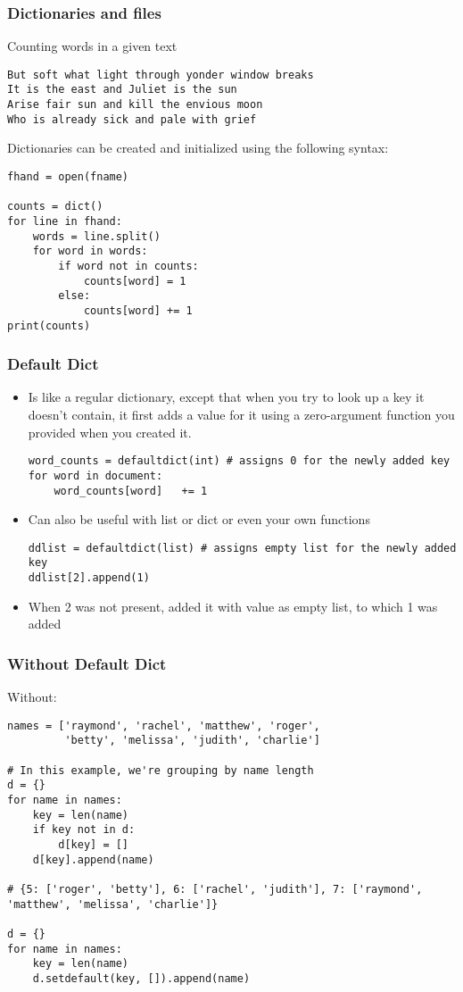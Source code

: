 \begin{frame}[fragile]\frametitle{Dictionaries and files}
Counting words in a given text
\begin{lstlisting}
But soft what light through yonder window breaks
It is the east and Juliet is the sun
Arise fair sun and kill the envious moon
Who is already sick and pale with grief
\end{lstlisting}

  
  Dictionaries can be created and initialized using the following syntax:
\begin{lstlisting}
fhand = open(fname)

counts = dict()
for line in fhand:
	words = line.split()
	for word in words:
		if word not in counts:
			counts[word] = 1
		else:
		    counts[word] += 1
print(counts)
\end{lstlisting}

\end{frame}

\begin{frame}[fragile]\frametitle{Default Dict}
  \begin{itemize}
  \item Is like a regular dictionary, except that when you try	to look up a key it doesn't	contain, it first adds a value for it using a zero-argument function you provided when you created it.	
  \begin{lstlisting}
word_counts = defaultdict(int) # assigns 0 for the newly added key
for word in document:
	word_counts[word]	+= 1
  \end{lstlisting}
\item Can also be useful with list	or dict	or even your	own functions
  \begin{lstlisting}
ddlist = defaultdict(list) # assigns empty list for the newly added key
ddlist[2].append(1) 
  \end{lstlisting}
\item When 2 was not present, added it with value as empty list, to which 1 was added
  \end{itemize}
\end{frame}

\begin{frame}[fragile]\frametitle{Without Default Dict}
Without:
\begin{lstlisting}
names = ['raymond', 'rachel', 'matthew', 'roger',
         'betty', 'melissa', 'judith', 'charlie']

# In this example, we're grouping by name length
d = {}
for name in names:
    key = len(name)
    if key not in d:
        d[key] = []
    d[key].append(name)

# {5: ['roger', 'betty'], 6: ['rachel', 'judith'], 7: ['raymond', 'matthew', 'melissa', 'charlie']}

d = {}
for name in names:
    key = len(name)
    d.setdefault(key, []).append(name)
\end{lstlisting}
\end{frame}

